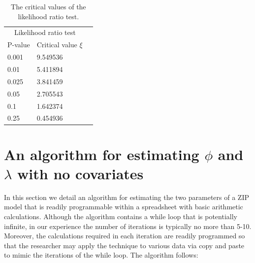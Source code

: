 \documentclass{article}
\begin{document}
\begin{table}
 \label{tab:table1}
\begin{center}
\begin{tabular}{llr}
\hline
\multicolumn{2}{c}{Likelihood ratio test} \\
\cline{1-2}
P-value & Critical value $\xi$ \\
\hline
0.001 & 9.549536\\
0.01 &5.411894 \\
0.025 &3.841459\\
0.05 &2.705543\\
0.1 &1.642374\\
0.25 & 0.454936\\
\hline
\end{tabular}
\end{center}
\caption{The critical values of the likelihood ratio test. }
\end{table}

\section{An algorithm for estimating $\phi$ and $\lambda$ with no covariates}

In this section we detail an algorithm for estimating the two parameters of a ZIP model that is readily programmable within a spreadsheet with basic arithmetic calculations. Although the algorithm contains a while loop that is potentially infinite, in our experience the number of iterations is typically no more than 5-10. Moreover, the calculations required in each iteration are readily programmed so that the researcher may apply the technique to various data via copy and paste to mimic the iterations of the while loop. The algorithm follows: 
\end{document}
